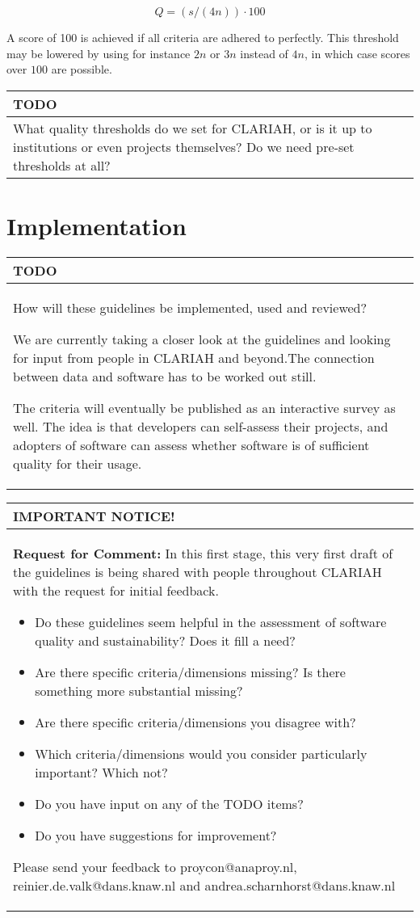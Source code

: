 \documentclass[a4paper,11pt]{article}
\newenvironment{notice}{
\begin{center}
    \begin{tabular}[h!]{|p{0.8\textwidth}|}
    \hline
    {\bf IMPORTANT NOTICE!}\\\hline}
{   \\\hline
    \end{tabular}
\end{center}}
\newenvironment{TODO}{
\begin{center}
    \begin{tabular}[h!]{|p{0.8\textwidth}|}
    \hline
    {\bf TODO}\\\hline}
{   \\\hline
    \end{tabular}
\end{center}}
\begin{document}
\begin{equation}
\label{eq1}
Q = (s / (4n)) \cdot 100
\end{equation}

A score of 100 is achieved if all criteria are adhered to perfectly. This
threshold may be lowered by using for instance $2n$ or $3n$ instead of $4n$, in
which case scores over $100$ are possible.

\begin{TODO}
What quality thresholds do we set for CLARIAH, or is it up
to institutions or even projects themselves? Do we need pre-set thresholds at
all?
\end{TODO}



\section{Implementation}

\begin{TODO}
How will these guidelines be implemented, used and reviewed?

We are currently taking a closer look at the guidelines and looking for input
from people in CLARIAH and beyond.The connection between data and software has
to be worked out still.

The criteria will eventually be published as an interactive
survey as well. The idea is that developers can self-assess their projects, and
adopters of software can assess whether software is of sufficient quality for
their usage.
\end{TODO}

\begin{notice}
\textbf{Request for Comment:} In this first stage, this very first draft of the guidelines is being shared with
people throughout CLARIAH with the request for initial feedback. 
\begin{itemize}
    \item Do these guidelines seem helpful in the assessment of software
        quality and sustainability? Does it fill a need?
    \item Are there specific criteria/dimensions missing? Is there something more substantial missing?
    \item Are there specific criteria/dimensions you disagree with?
    \item Which criteria/dimensions would you consider particularly important?  Which not?
    \item Do you have input on any of the TODO items?
    \item Do you have suggestions for improvement?
\end{itemize}

Please send your feedback to proycon@anaproy.nl, reinier.de.valk@dans.knaw.nl and andrea.scharnhorst@dans.knaw.nl
\end{notice}
\end{document}
